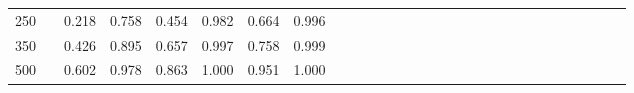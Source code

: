 % 
\begin{tabular}{ccccccccccccccccccccccccccccc}
  \hline
  \hline
250 &  & 0.218 & 0.758 & 0.454 & 0.982 & 0.664 & 0.996 &  &  &  &  &  &  &  &  &  &  &  &  &  &  &  &  &  &  &  &  &  \\ 
  350 &  & 0.426 & 0.895 & 0.657 & 0.997 & 0.758 & 0.999 &  &  &  &  &  &  &  &  &  &  &  &  &  &  &  &  &  &  &  &  &  \\ 
  500 &  & 0.602 & 0.978 & 0.863 & 1.000 & 0.951 & 1.000 &  &  &  &  &  &  &  &  &  &  &  &  &  &  &  &  &  &  &  &  &  \\ 
   \hline
\end{tabular}
